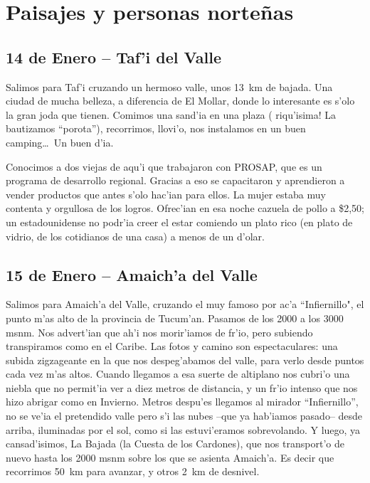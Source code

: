 \section{Paisajes y personas norte\~nas}

\subsection*{14 de Enero -- Taf'i del Valle}

Salimos para Taf'i cruzando un hermoso valle, unos 13~km de bajada. Una ciudad
de mucha belleza, a diferencia de El Mollar, donde lo interesante es s'olo la
gran joda que tienen. Comimos una sand'ia en una plaza (\textexclamdown
riqu'isima! La bautizamos ``porota''), recorrimos, llovi'o, nos instalamos en un
buen camping\ldots\ Un buen d'ia.

Conocimos a dos viejas de aqu'i que trabajaron con {\small PROSAP}, que
es un programa de desarrollo regional. Gracias a eso se capacitaron y
aprendieron a vender productos que antes s'olo hac'ian para ellos. La mujer
estaba muy contenta y orgullosa de los logros. Ofrec'ian en esa noche cazuela de
pollo a \$2,50; un estadounidense no podr'ia creer el estar comiendo un plato
rico (en plato de vidrio, de los cotidianos de una casa) a menos de un d'olar.

\subsection*{15 de Enero -- Amaich'a del Valle}

Salimos para Amaich'a del Valle, cruzando el muy famoso por ac'a ``Infiernillo",
el punto m'as alto de la provincia de Tucum'an. Pasamos de los 2000 a los 3000
msnm. Nos advert'ian que ah'i
nos morir'iamos de fr'io, pero subiendo transpiramos como en el Caribe. Las
fotos y camino son espectaculares: una subida zigzageante en la que nos
despeg'abamos del valle, para verlo desde puntos cada vez m'as altos. Cuando
llegamos a esa suerte de altiplano nos cubri'o una niebla que no permit'ia ver a
diez metros de distancia, y un fr'io intenso que nos hizo abrigar como en
Invierno. Metros despu'es llegamos al mirador ``Infiernillo'', no se ve'ia el
pretendido valle pero s'i las nubes --que ya hab'iamos pasado-- desde arriba,
iluminadas por el sol, como si las estuvi'eramos sobrevolando. Y luego, ya
cansad'isimos, La Bajada (la Cuesta de los Cardones), que nos transport'o
de nuevo hasta los 2000 msnm sobre los que se asienta Amaich'a. Es decir que
recorrimos 50~km para avanzar, y otros 2~km de desnivel.

